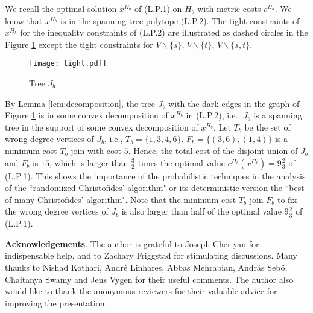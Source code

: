 \documentclass[11pt]{article}
\begin{document}
We recall the optimal solution $x^{H_b}$ of (L.P.1) on $H_b$ with metric costs $c^{H_b}$. We know that $x^{H_b}$ is in the spanning
tree polytope (L.P.2). The tight constraints of $x^{H_b}$ for the inequality constraints of (L.P.2) are illustrated as dashed circles in the Figure \ref{TreeJB} except
the tight constraints for $V\backslash \{s\}$, $V\backslash \{t\}$, $V\backslash \{s, t\}$.
\begin{figure}[h]
\begin{center}
\texttt{[image: tight.pdf]}\\
  \caption{Tree $J_b$}
  \label{TreeJB}
\end{center}
\end{figure}

By Lemma \ref{lem:decomposition}, the tree $J_b$ with the dark edges in the graph of Figure \ref{TreeJB} is in some convex decomposition of $x^{H_b}$ in (L.P.2),
i.e., $J_b$ is a spanning tree in the support of some convex decomposition of $x^{H_b}$. Let $T_b$ be the set of wrong degree vertices of $J_b$, i.e., $T_b=\{1, 3, 4, 6\}$. $F_b=\{(3, 6), (1, 4)\}$ is a minimum-cost $T_b$-join with cost $5$. Hence, the total cost
of the disjoint union of $J_b$ and $F_b$ is $15$, which is larger than $\frac{3}{2}$ times the optimal value $c^{H_b}(x^{H_b})=9\frac{2}{3}$ of (L.P.1). This shows the importance of the probabilistic techniques in the analysis of
the ``randomized Christofides' algorithm" or its
deterministic version the ``best-of-many Christofides' algorithm". Note that the minimum-cost $T_b$-join $F_b$ to
fix the wrong degree vertices of $J_b$ is also larger than half of the optimal value $9\frac{2}{3}$ of (L.P.1).

\medskip
\noindent
{\bf Acknowledgements}.
The author is grateful to Joseph Cheriyan for indispensable help, and to Zachary Friggstad for stimulating discussions.  Many thanks to Nishad Kothari, Andr\'{e} Linhares, Abbas Mehrabian, Andr\'{a}s Seb\H{o}, Chaitanya Swamy and Jens Vygen for their useful comments. The author also would like to thank the anonymous reviewers for their valuable advice for improving the presentation.





\end{document}
